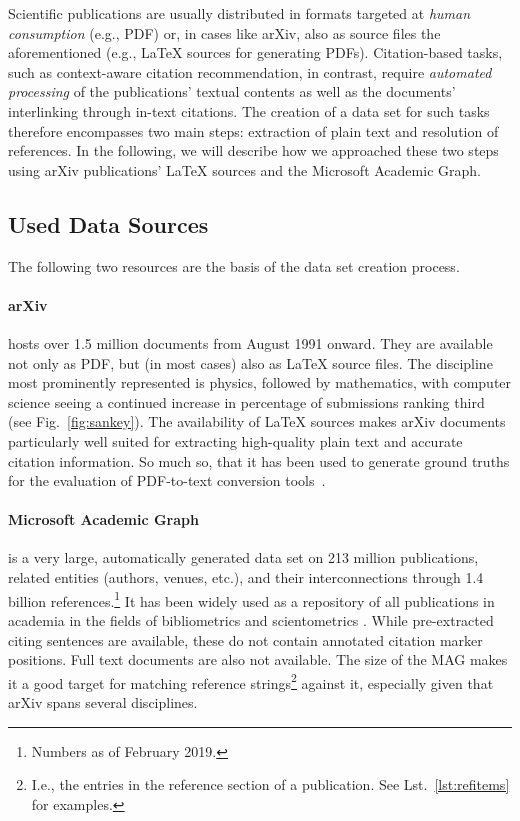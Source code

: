 Scientific publications are usually distributed in formats targeted at \emph{human consumption} (e.g., PDF) or, in cases like arXiv, also as source files the aforementioned (e.g., \LaTeX{} sources for generating PDFs). Citation-based tasks, such as context-aware citation recommendation, in contrast, require \emph{automated processing} of the publications' textual contents as well as the documents' interlinking through in-text citations. The creation of a data set for such tasks therefore encompasses two main steps: extraction of plain text and resolution of references. In the following, we will describe how we approached these two steps using arXiv publications' \LaTeX{} sources and the Microsoft Academic Graph.

\subsection{Used Data Sources}
The following two resources are the basis of the data set creation process.

\paragraph{arXiv} hosts over 1.5 million documents from August 1991 onward.%
 They are available not only as PDF, but (in most cases) also as \LaTeX{} source files. The discipline most prominently represented is physics, followed by mathematics, with computer science seeing a continued increase in percentage of submissions ranking third (see Fig.~\ref{fig:sankey}). The availability of \LaTeX{} sources makes arXiv documents particularly well suited for extracting high-quality plain text and accurate citation information. So much so, that it has been used to generate ground truths for the evaluation of PDF-to-text conversion tools~\cite{Bast2017}.
\paragraph{Microsoft Academic Graph} is a very large, automatically generated data set on 213 million publications, related entities (authors, venues, etc.), and their interconnections through 1.4 billion references.\footnote{Numbers as of February 2019.} It has been widely used as a repository of all publications in academia in the fields of bibliometrics and scientometrics \cite{Mohapatra2019}. While pre-extracted citing sentences are available, these do not contain annotated citation marker positions. Full text documents are also not available. The size of the MAG makes it a good target for matching reference strings\footnote{I.e., the entries in the reference section of a publication. See Lst.~\ref{lst:refitems} for examples.} against it, especially given that arXiv spans several disciplines.

